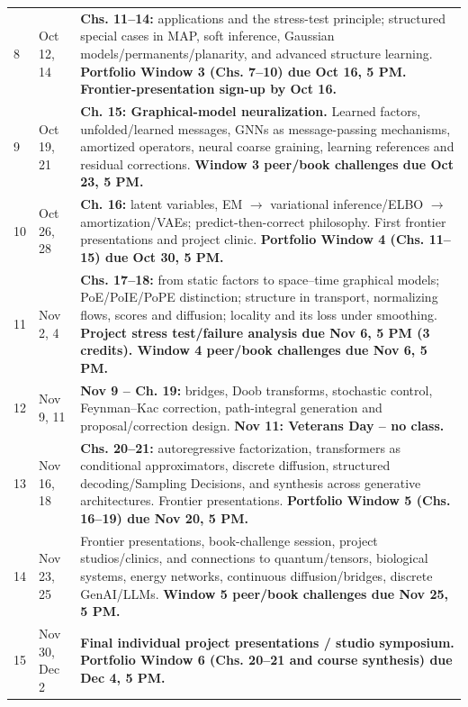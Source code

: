 \documentclass[11pt]{article}
\begin{document}
\begin{longtable}{p{1.45cm} p{2.75cm} p{8.9cm}}
8 & Oct 12, 14 & \textbf{Chs. 11--14:} applications and the stress-test principle; structured special cases in MAP, soft inference, Gaussian models/permanents/planarity, and advanced structure learning. \textbf{Portfolio Window 3 (Chs. 7--10) due Oct 16, 5 PM. Frontier-presentation sign-up by Oct 16.}\\

9 & Oct 19, 21 & \textbf{Ch. 15: Graphical-model neuralization.} Learned factors, unfolded/learned messages, GNNs as message-passing mechanisms, amortized operators, neural coarse graining, learning references and residual corrections. \textbf{Window 3 peer/book challenges due Oct 23, 5 PM.}\\

10 & Oct 26, 28 & \textbf{Ch. 16:} latent variables, EM $\rightarrow$ variational inference/ELBO $\rightarrow$ amortization/VAEs; predict-then-correct philosophy. First frontier presentations and project clinic. \textbf{Portfolio Window 4 (Chs. 11--15) due Oct 30, 5 PM.}\\

11 & Nov 2, 4 & \textbf{Chs. 17--18:} from static factors to space--time graphical models; PoE/PoIE/PoPE distinction; structure in transport, normalizing flows, scores and diffusion; locality and its loss under smoothing. \textbf{Project stress test/failure analysis due Nov 6, 5 PM (3 credits). Window 4 peer/book challenges due Nov 6, 5 PM.}\\

12 & Nov 9, 11 & \textbf{Nov 9 -- Ch. 19:} bridges, Doob transforms, stochastic control, Feynman--Kac correction, path-integral generation and proposal/correction design. \textbf{Nov 11: Veterans Day -- no class.}\\

13 & Nov 16, 18 & \textbf{Chs. 20--21:} autoregressive factorization, transformers as conditional approximators, discrete diffusion, structured decoding/Sampling Decisions, and synthesis across generative architectures. Frontier presentations. \textbf{Portfolio Window 5 (Chs. 16--19) due Nov 20, 5 PM.}\\

14 & Nov 23, 25 & Frontier presentations, book-challenge session, project studios/clinics, and connections to quantum/tensors, biological systems, energy networks, continuous diffusion/bridges, discrete GenAI/LLMs. \textbf{Window 5 peer/book challenges due Nov 25, 5 PM.}\\

15 & Nov 30, Dec 2 & \textbf{Final individual project presentations / studio symposium.} \textbf{Portfolio Window 6 (Chs. 20--21 and course synthesis) due Dec 4, 5 PM.}\\


\end{longtable}
\end{document}
